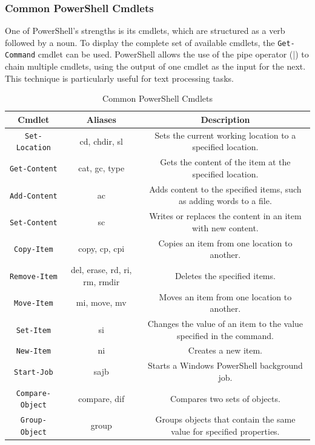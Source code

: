\subsubsection{Common PowerShell Cmdlets}
One of PowerShell's strengths is its cmdlets, which are structured as a verb followed by a noun. To display the complete set of available cmdlets, the \texttt{Get-Command} cmdlet can be used. PowerShell allows the use of the pipe operator (|) to chain multiple cmdlets, using the output of one cmdlet as the input for the next. This technique is particularly useful for text processing tasks.

\begin{table}[h!]
    \centering
    \begin{adjustbox}{width=1\textwidth}
    \begin{tabular}{|c|c|c|}
    \hline
    \textbf{Cmdlet} & \textbf{Aliases} & \textbf{Description} \\
    \hline
    \texttt{Set-Location} & cd, chdir, sl & Sets the current working location to a specified location. \\
    \texttt{Get-Content} & cat, gc, type & Gets the content of the item at the specified location. \\
    \texttt{Add-Content} & ac & Adds content to the specified items, such as adding words to a file. \\
    \texttt{Set-Content} & sc & Writes or replaces the content in an item with new content. \\
    \texttt{Copy-Item} & copy, cp, cpi & Copies an item from one location to another. \\
    \texttt{Remove-Item} & del, erase, rd, ri, rm, rmdir & Deletes the specified items. \\
    \texttt{Move-Item} & mi, move, mv & Moves an item from one location to another. \\
    \texttt{Set-Item} & si & Changes the value of an item to the value specified in the command. \\
    \texttt{New-Item} & ni & Creates a new item. \\
    \texttt{Start-Job} & sajb & Starts a Windows PowerShell background job. \\
    \texttt{Compare-Object} & compare, dif & Compares two sets of objects. \\
    \texttt{Group-Object} & group & Groups objects that contain the same value for specified properties. \\
    \hline
    \end{tabular}
\end{adjustbox}
    \caption{Common PowerShell Cmdlets}
    \label{table:cmdlets}
    \end{table}

